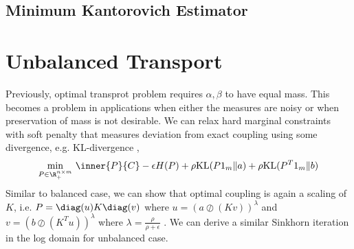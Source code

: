 \documentclass[11pt]{article}
\begin{document}
\subsection{Minimum Kantorovich Estimator}

 

\section{Unbalanced Transport}

Previously, optimal transprot problem requires $\alpha,\beta$ to have equal mass. This becomes a problem in applications when either the measures are noisy or when preservation of mass is not desirable. We can relax hard marginal constraints with soft penalty that measures deviation from exact coupling using some divergence, e.g. KL-divergence \cite{chizatScalingAlgorithmsUnbalanced2017},
\begin{align}
    \min_{P\in\R^{n\times m}_+}\, 
        \inner{P}{C} - \epsilon H(P) + \rho \text{KL}(P1_m \Vert a) + \rho \text{KL}(P^T 1_m \Vert b)
\end{align}
Similar to balanced case, we can show that optimal coupling is again a scaling of $K$, i.e. $P = \diag(u) K \diag(v)$ where $u = (a \oslash (Kv))^{\lambda}$ and $v = (b \oslash (K^T u))^{\lambda}$ where $\lambda = \frac{\rho}{\rho + \epsilon}$ \cite{frognerLearningWassersteinLoss2015}. We can derive a similar Sinkhorn iteration in the log domain for unbalanced case.








\newpage
\printbibliography 
\end{document}
